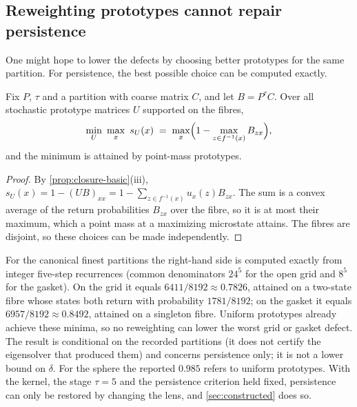 \subsection{Reweighting prototypes cannot repair persistence}

One might hope to lower the defects by choosing better prototypes for the same partition.
For persistence, the best possible choice can be computed exactly.

\begin{theorem}
\label{thm:prototype-obstruction}
Fix $P$, $\tau$ and a partition with coarse matrix $C$, and let $B=P^{\tau}C$.
Over all stochastic prototype matrices $U$ supported on the fibres,
\begin{equation}
\min_U\ \max_{x}\ s_U(x)\;=\;\max_x\Bigl(1-\max_{z\in f^{-1}(x)}B_{zx}\Bigr),
\end{equation}
and the minimum is attained by point-mass prototypes.
\end{theorem}

\begin{proof}
By \cref{prop:closure-basic}(iii), $s_U(x)=1-(UB)_{xx}=1-\sum_{z\in f^{-1}(x)}u_x(z)B_{zx}$.
The sum is a convex average of the return probabilities $B_{zx}$ over the fibre, so it is at most their maximum, which a point mass at a maximizing microstate attains.
The fibres are disjoint, so these choices can be made independently.
\end{proof}


For the canonical finest partitions the right-hand side is computed exactly from integer five-step recurrences (common denominators $24^5$ for the open grid and $8^5$ for the gasket).
On the grid it equals $6411/8192\approx0.7826$, attained on a two-state fibre whose states both return with probability $1781/8192$; on the gasket it equals $6957/8192\approx0.8492$, attained on a singleton fibre.
Uniform prototypes already achieve these minima, so no reweighting can lower the worst grid or gasket defect.
The result is conditional on the recorded partitions (it does not certify the eigensolver that produced them) and concerns persistence only; it is not a lower bound on $\delta$.
For the sphere the reported $0.985$ refers to uniform prototypes.
With the kernel, the stage $\tau=5$ and the persistence criterion held fixed, persistence can only be restored by changing the lens, and \cref{sec:constructed} does so.

